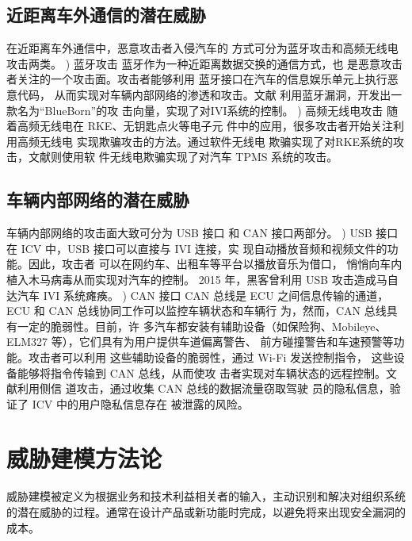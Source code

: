 \subsection{近距离车外通信的潜在威胁}
在近距离车外通信中，恶意攻击者入侵汽车的
方式可分为蓝牙攻击和高频无线电攻击两类。
) 蓝牙攻击
蓝牙作为一种近距离数据交换的通信方式，也
是恶意攻击者关注的一个攻击面。攻击者能够利用
蓝牙接口在汽车的信息娱乐单元上执行恶意代码，
从而实现对车辆内部网络的渗透和攻击。文献\cite{antian}
利用蓝牙漏洞，开发出一款名为“BlueBorn”的攻
击向量，实现了对IVI系统的控制。
) 高频无线电攻击
随着高频无线电在 RKE、无钥匙点火等电子元
件中的应用，很多攻击者开始关注利用高频无线电
实现欺骗攻击的方法。通过软件无线电
欺骗实现了对RKE系统的攻击，文献\cite{wuxiandian}则使用软
件无线电欺骗实现了对汽车 TPMS 系统的攻击。

\subsection{车辆内部网络的潜在威胁}
车辆内部网络的攻击面大致可分为 USB 接口
和 CAN 接口两部分。
) USB 接口
在 ICV 中，USB 接口可以直接与 IVI 连接，实
现自动播放音频和视频文件的功能。因此，攻击者
可以在网约车、出租车等平台以播放音乐为借口，
悄悄向车内植入木马病毒从而实现对汽车的控制。
2015 年，黑客曾利用 USB 攻击造成马自达汽车 IVI
系统瘫痪。
) CAN 接口
CAN 总线是 ECU 之间信息传输的通道，ECU
和 CAN 总线协同工作可以监控车辆状态和车辆行
为，然而，CAN 总线具有一定的脆弱性。目前，许
多汽车都安装有辅助设备（如保险狗、Mobileye、
ELM327 等），它们具有为用户提供车道偏离警告、
前方碰撞警告和车速预警等功能。攻击者可以利用
这些辅助设备的脆弱性，通过 Wi-Fi 发送控制指令，
这些设备能够将指令传输到 CAN 总线，从而使攻
击者实现对车辆状态的远程控制。文献\cite{koscher2010experimental}利用侧信
道攻击，通过收集 CAN 总线的数据流量窃取驾驶
员的隐私信息，验证了 ICV 中的用户隐私信息存在
被泄露的风险。


\section{威胁建模方法论}
威胁建模被定义为根据业务和技术利益相关者的输入，主动识别和解决对组织系统的潜在威胁的过程。通常在设计产品或新功能时完成，以避免将来出现安全漏洞的成本。


